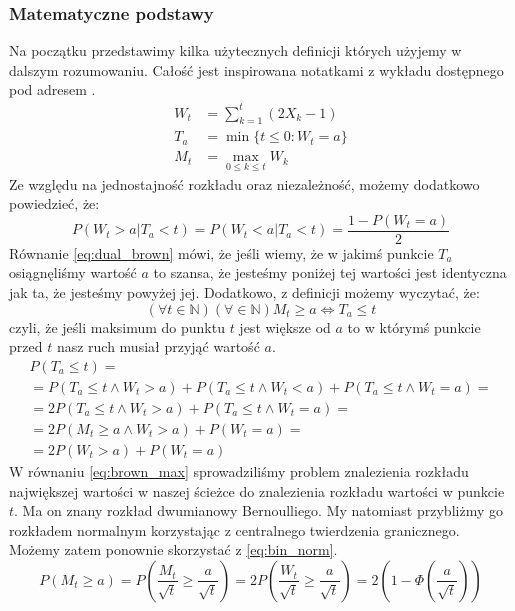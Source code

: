 \subsubsection{Matematyczne podstawy}
Na początku przedstawimy kilka użytecznych definicji których użyjemy w dalszym rozumowaniu. Całość jest inspirowana notatkami z wykładu dostępnego pod adresem \cite{Max_Brown}.
\begin{equation}
    \begin{split}
        W_t &= \sum_{k=1}^{t}(2X_k - 1)\\
        T_a &= \min\{t \leq 0: W_t = a\} \\
        M_t &= \max_{0\leq k \leq t}W_k
    \end{split}
\end{equation}
Ze względu na jednostajność rozkładu oraz niezależność, możemy dodatkowo powiedzieć, że: 
\begin{equation}
 \label{eq:dual_brown}
    P(W_t > a | T_a < t) =  P(W_t < a | T_a < t) = \frac{1 - P(W_t = a)}{2}
\end{equation}
Równanie \ref{eq:dual_brown} mówi, że jeśli wiemy, że w jakimś punkcie $T_a$ osiągnęliśmy wartość $a$ to szansa, że jesteśmy poniżej tej wartości jest identyczna jak ta, że jesteśmy powyżej jej. Dodatkowo, z definicji możemy wyczytać, że:
\begin{equation}
\label{eq:m_eq_t}
    (\forall t \in \mathbb{N})(\forall \in \mathbb{N})M_t \geq a \Longleftrightarrow T_a \leq t
\end{equation}
czyli, że jeśli maksimum do punktu $t$ jest większe od $a$ to w którymś punkcie przed $t$ nasz ruch musiał przyjąć wartość $a$.
\begin{equation}
\label{eq:brown_max}
    \begin{gathered}
    P(T_a \leq t) =\\
    =P(T_a \leq t \land W_t>a)+P(T_a \leq t \land W_t<a)+P(T_a \leq t \land W_t=a) = \\
    =2P(T_a \leq t \land W_t>a) + P(T_a \leq t \land W_t=a) =\\
    =2P(M_t \geq a \land W_t>a) + P(W_t=a) =\\ 
    =2P(W_t>a) + P(W_t=a)
    \end{gathered}
\end{equation}
W równaniu \ref{eq:brown_max} sprowadziliśmy problem znalezienia rozkładu największej wartości w naszej ścieżce do znalezienia rozkładu wartości w punkcie $t$. Ma on znany rozkład dwumianowy Bernoulliego. My natomiast przybliżmy go rozkładem normalnym korzystając z centralnego twierdzenia granicznego. Możemy zatem ponownie skorzystać z \ref{eq:bin_norm}.
\begin{equation}
    P(M_t \geq a) = P\left(\frac{M_t}{\sqrt{t}} \geq \frac{a}{\sqrt{t}}\right) = 2P\left(\frac{W_t}{\sqrt{t}} \geq \frac{a}{\sqrt{t}}\right) = 2\left(1 - \Phi\left(\frac{a}{\sqrt{t}}\right)\right)
\end{equation}
